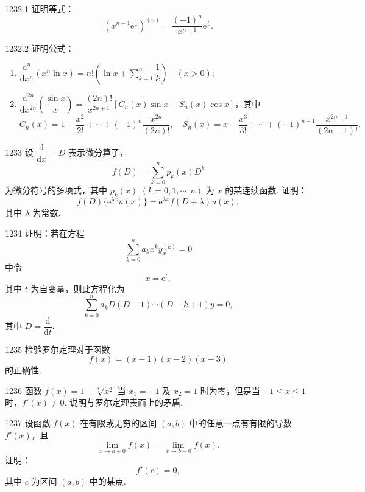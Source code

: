 \begin{prob}[M]{1232.1}
证明等式：
\[
\left(x^{n-1} \mathrm{e}^{\frac{1}{x}}\right)^{(n)} = \frac{(-1)^n}{x^{n+1}} \mathrm{e}^{\frac{1}{x}}.
\]
\end{prob}

\begin{prob}[M]{1232.2}
证明公式：
\begin{enumerate}[label=(\alph*), itemsep=2pt, topsep=3pt]
  \item $\dfrac{\mathrm{d}^n}{\mathrm{d}x^n}(x^n \ln x) = n!\left(\ln x + \sum\limits_{k=1}^{n} \dfrac{1}{k}\right) \quad (x > 0)$;
  \item $\dfrac{\mathrm{d}^{2n}}{\mathrm{d}x^{2n}}\left(\dfrac{\sin x}{x}\right) = \dfrac{(2n)!}{x^{2n+1}}[C_n(x)\sin x - S_n(x)\cos x]$，其中
  \[
  C_n(x) = 1 - \frac{x^2}{2!} + \cdots + (-1)^n \frac{x^{2n}}{(2n)!}, \quad S_n(x) = x - \frac{x^3}{3!} + \cdots + (-1)^{n-1} \frac{x^{2n-1}}{(2n-1)!}.
  \]
\end{enumerate}
\end{prob}

\begin{prob}[M]{1233}
设 $\dfrac{\mathrm{d}}{\mathrm{d}x} = D$ 表示微分算子，
\[
f(D) = \sum_{k=0}^{n} p_k(x) D^k
\]
为微分符号的多项式，其中 $p_k(x)$ $(k = 0, 1, \cdots, n)$ 为 $x$ 的某连续函数. 证明：
\[
f(D)\{\mathrm{e}^{\lambda x} u(x)\} = \mathrm{e}^{\lambda x} f(D + \lambda) u(x),
\]
其中 $\lambda$ 为常数.
\end{prob}

\begin{prob}[M]{1234}
证明：若在方程
\[
\sum_{k=0}^{n} a_k x^k y_x^{(k)} = 0
\]
中令
\[
x = \mathrm{e}^t,
\]
其中 $t$ 为自变量，则此方程化为
\[
\sum_{k=0}^{n} a_k D(D - 1)\cdots(D - k + 1) y = 0,
\]
其中 $D = \dfrac{\mathrm{d}}{\mathrm{d}t}$.
\end{prob}


\begin{prob}[S]{1235}
检验罗尔定理对于函数
\[
f(x) = (x - 1)(x - 2)(x - 3)
\]
的正确性.
\end{prob}

\begin{prob}[M]{1236}
函数 $f(x) = 1 - \sqrt[3]{x^2}$ 当 $x_1 = -1$ 及 $x_2 = 1$ 时为零，但是当 $-1 \leqslant x \leqslant 1$ 时，$f'(x) \neq 0$. 说明与罗尔定理表面上的矛盾.
\end{prob}

\begin{prob}[M]{1237}
设函数 $f(x)$ 在有限或无穷的区间 $(a, b)$ 中的任意一点有有限的导数 $f'(x)$，且
\[
\lim_{x \to a+0} f(x) = \lim_{x \to b-0} f(x).
\]
证明：
\[
f'(c) = 0,
\]
其中 $c$ 为区间 $(a, b)$ 中的某点.
\end{prob}

